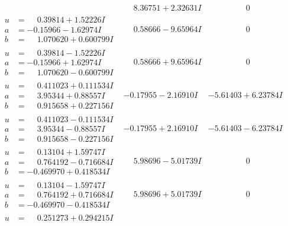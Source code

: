 \documentclass[1p]{elsarticle_modified}
\theoremstyle{definition}
\begin{document}
$$\begin{array}{c|c|c}
 & \phantom{-}8.36751 + 2.32631 I & \phantom{-0.000000 } 0 \\ \hline\begin{aligned}
u &= \phantom{-}0.39814 + 1.52226 I \\
a &= -0.15966 - 1.62974 I \\
b &= \phantom{-}1.070620 + 0.600799 I\end{aligned}
 & \phantom{-}0.58666 - 9.65964 I & \phantom{-0.000000 } 0 \\ \hline\begin{aligned}
u &= \phantom{-}0.39814 - 1.52226 I \\
a &= -0.15966 + 1.62974 I \\
b &= \phantom{-}1.070620 - 0.600799 I\end{aligned}
 & \phantom{-}0.58666 + 9.65964 I & \phantom{-0.000000 } 0 \\ \hline\begin{aligned}
u &= \phantom{-}0.411023 + 0.111534 I \\
a &= \phantom{-}3.95344 + 0.88557 I \\
b &= \phantom{-}0.915658 + 0.227156 I\end{aligned}
 & -0.17955 - 2.16910 I & -5.61403 + 6.23784 I \\ \hline\begin{aligned}
u &= \phantom{-}0.411023 - 0.111534 I \\
a &= \phantom{-}3.95344 - 0.88557 I \\
b &= \phantom{-}0.915658 - 0.227156 I\end{aligned}
 & -0.17955 + 2.16910 I & -5.61403 - 6.23784 I \\ \hline\begin{aligned}
u &= \phantom{-}0.13104 + 1.59747 I \\
a &= \phantom{-}0.764192 - 0.716684 I \\
b &= -0.469970 + 0.418534 I\end{aligned}
 & \phantom{-}5.98696 - 5.01739 I & \phantom{-0.000000 } 0 \\ \hline\begin{aligned}
u &= \phantom{-}0.13104 - 1.59747 I \\
a &= \phantom{-}0.764192 + 0.716684 I \\
b &= -0.469970 - 0.418534 I\end{aligned}
 & \phantom{-}5.98696 + 5.01739 I & \phantom{-0.000000 } 0 \\ \hline\begin{aligned}
u &= \phantom{-}0.251273 + 0.294215 I \\

\end{aligned}
\end{array}$$
\end{document}
